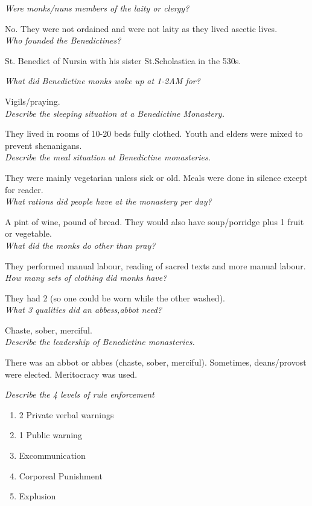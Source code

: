 \documentclass[12pt]{article}
\begin{document}
\textit{Were monks/nuns members of the laity or clergy?}

No. They were not ordained and were not laity as they lived ascetic lives.\\

\textit{Who founded the Benedictines?}

St. Benedict of Nursia with his sister St.Scholastica in the 530s.

\textit{What did Benedictine monks wake up at 1-2AM for?}

Vigils/praying.\\

\textit{Describe the sleeping situation at a Benedictine Monastery.}

They lived in rooms of 10-20 beds fully clothed. Youth and elders were mixed to prevent shenanigans.\\

\textit{Describe the meal situation at Benedictine monasteries.}

They were mainly vegetarian unless sick or old. Meals were done in silence except for reader.\\

\textit{What rations did people have at the monastery per day?}

A pint of wine, pound of bread. They would also have soup/porridge plus 1 fruit or vegetable.\\

\textit{What did the monks do other than pray?}

They performed manual labour, reading of sacred texts and more manual labour.\\

\textit{How many sets of clothing did monks have?}

They had 2 (so one could be worn while the other washed).\\

\textit{What 3 qualities did an abbess,abbot need?}

Chaste, sober, merciful.\\

\textit{Describe the leadership of Benedictine monasteries.}

There was an abbot or abbes (chaste, sober, merciful). Sometimes, deans/provost were elected. Meritocracy was used.

\textit{Describe the 4 levels of rule enforcement}

\begin{enumerate}
	\item 2 Private verbal warnings
	\item 1 Public warning
	\item Excommunication
	\item Corporeal Punishment
	\item Explusion
\end{enumerate}
\end{document}
